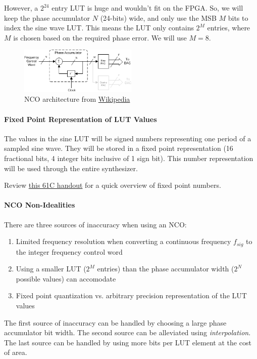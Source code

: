 \documentclass[11pt]{article}
\begin{document}
However, a $2^{24}$ entry LUT is huge and wouldn't fit on the FPGA.
So, we will keep the phase accumulator $N$ (24-bits) wide, and only use the MSB $M$ bits to index the sine wave LUT.
This means the LUT only contains $2^M$ entries, where $M$ is chosen based on the required phase error.
We will use $M = 8$.

\begin{figure}
  \centering
  \includegraphics[width=0.5\textwidth]{images/Generic_NCO.png}
  \caption{NCO architecture from \href{https://en.wikipedia.org/wiki/Numerically-controlled_oscillator}{Wikipedia}}
\end{figure}

\paragraph{Fixed Point Representation of LUT Values}
The values in the sine LUT will be signed numbers representing one period of a sampled sine wave.
They will be stored in a fixed point representation (16 fractional bits, 4 integer bits inclusive of 1 sign bit).
This number representation will be used through the entire synthesizer.

Review \href{http://www-inst.eecs.berkeley.edu/~cs61c/sp06/handout/fixedpt.html}{this 61C handout} for a quick overview of fixed point numbers.

\paragraph{NCO Non-Idealities}
There are three sources of inaccuracy when using an NCO:
\begin{enumerate}
  \item Limited frequency resolution when converting a continuous frequency $f_{sig}$ to the integer frequency control word
  \item Using a smaller LUT ($2^M$ entries) than the phase accumulator width ($2^N$ possible values) can accomodate
  \item Fixed point quantization vs. arbitrary precision representation of the LUT values
\end{enumerate}

The first source of inaccuracy can be handled by choosing a large phase accumulator bit width.
The second source can be alleviated using \textit{interpolation}.
The last source can be handled by using more bits per LUT element at the cost of area.
\end{document}
